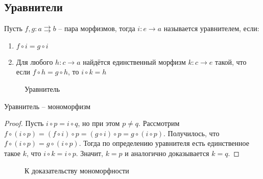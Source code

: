 \subsection{Уравнители}
\begin{defn}
  Пусть $f, g \colon a \rightrightarrows b$ -- пара морфизмов, тогда $i \colon e \to
  a$ называется уравнителем, если:
  \begin{enumerate}
    \item $f \circ i = g \circ i$
    \item Для любого $h \colon c \to a$ найдётся единственный морфизм
      $k \colon c \to e$ такой, что если $f \circ h = g \circ h$,
      то $i \circ k = h$
  \end{enumerate}
\end{defn}
\begin{figure}[h]
  \centering
  \caption{Уравнитель}
  \label{fig:equaliser}
\end{figure}

\begin{thm}
  Уравнитель -- мономорфизм
\end{thm}
\begin{proof}
  Пусть $i \circ p = i \circ q$, но при этом $p \neq q$.
  Рассмотрим $f \circ (i \circ p) = (f \circ i) \circ p = (g \circ i) \circ p = g \circ (i \circ p)$.
  Получилось, что $f \circ (i \circ p) = g \circ (i \circ p)$.
  Тогда по определению уравнителя есть единственное такое $k$, что $i \circ k = i \circ p$.
  Значит, $k = p$ и аналогично доказывается $k = q$.
\end{proof}
\begin{figure}[h]
  \centering
  \caption{К доказательству мономорфности}
  \label{fig:equaliser-monomorphism}
\end{figure}

